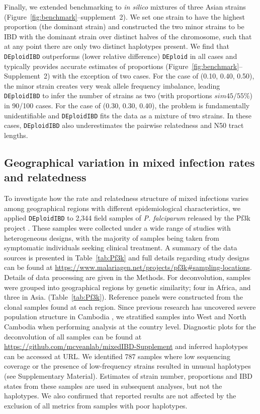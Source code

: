 \documentclass[9pt,lineno]{elife}
\begin{document}
Finally, we extended benchmarking to \emph{in silico} mixtures of three Asian strains  (Figure~\ref{fig:benchmark}--supplement~2). We set one strain to have the highest proportion (the dominant strain) and constructed the two minor strains to be IBD with the dominant strain over distinct halves of the chromosome, such that at any point there are only two distinct haplotypes present.  We find that \texttt{DEploidIBD} outperforms (lower relative difference) \texttt{DEploid} in all cases and typically provides accurate estimates of proportions (Figure~\ref{fig:benchmark}--Supplement~2) with the exception of two cases. For the case of (0.10, 0.40, 0.50), the minor strain creates very weak allele frequency imbalance, leading {\tt DEploidIBD} to infer the number of strains as two (with proportions $sim 45/55\%$) in 90/100 cases. For the case of (0.30, 0.30, 0.40), the problem is fundamentally unidentifiable and \texttt{DEploidIBD} fits the data as a mixture of two strains.  In these cases, \texttt{DEploidIBD} also underestimates the pairwise relatedness and N50 tract lengths.


\subsection{Geographical variation in mixed infection rates and relatedness}

To investigate how the rate and relatedness structure of mixed infections varies among geographical regions with different epidemiological characteristics, we applied \texttt{DEploidIBD} to 2,344 field samples of {\it P. falciparum} released by the Pf3k project \citep{pf3k}.  These samples were collected under a wide range of studies with heterogeneous designs, with the majority of samples being taken from symptomatic individuals seeking clinical treatment. A summary of the data sources is presented in Table~\ref{tab:Pf3k} and full details regarding study designs can be found at \url{https://www.malariagen.net/projects/pf3k#sampling-locations}.  Details of data processing are given in the Methods. For deconvolution, samples were grouped into geographical regions by genetic similarity; four in Africa, and three in Asia. (Table~\ref{tab:Pf3k}). Reference panels were constructed from the clonal samples found at each region. Since previous research has uncovered severe population structure in Cambodia \citep{Miotto2013}, we stratified samples into West and North Cambodia when performing analysis at the country level. Diagnostic plots for the deconvolution of all samples can be found at \url{https://github.com/mcveanlab/mixedIBD-Supplement} and inferred haplotypes can be accessed at URL.  We identified 787 samples where low sequencing coverage or the presence of low-frequency strains resulted in unusual haplotypes (see Supplementary Material).  Estimates of strain number, proportions and IBD states from these samples are used in subsequent analyses, but not the haplotypes.  We also confirmed that reported results are not affected by the exclusion of all metrics from samples with poor haplotypes.
\end{document}
